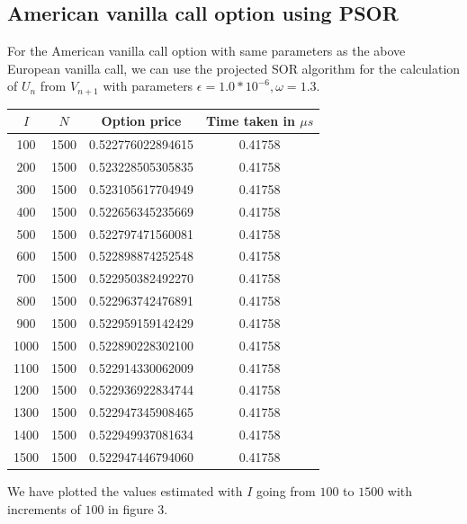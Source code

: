 \subsection{American vanilla call option using PSOR}

For the American vanilla call option with same parameters as the above European vanilla call, we can use the projected SOR algorithm for the calculation of $U_{n}$ from $V_{n+1}$ with parameters $\epsilon = 1.0 * 10^{-6}, \omega = 1.3$.

\begin{center}
	\begin{tabular}{| c | c | c | c |}
		\hline $I$ & $N$ & Option price & Time taken in $\mu s$\\
		[0.5ex]
		\hline 100 & 1500 & 0.522776022894615& 0.41758 \\
		\hline 200 & 1500 & 0.523228505305835& 0.41758 \\
		\hline 300 & 1500 & 0.523105617704949& 0.41758 \\
		\hline 400 & 1500 & 0.522656345235669& 0.41758 \\
		\hline 500 & 1500 & 0.522797471560081& 0.41758 \\
		\hline 600 & 1500 & 0.522898874252548& 0.41758 \\
		\hline 700 & 1500 & 0.522950382492270& 0.41758 \\
		\hline 800 & 1500 & 0.522963742476891& 0.41758 \\
		\hline 900 & 1500 & 0.522959159142429& 0.41758 \\
		\hline 1000 & 1500 &0.522890228302100 & 0.41758 \\
		\hline 1100 & 1500 &0.522914330062009 & 0.41758 \\
		\hline 1200 & 1500 &0.522936922834744 & 0.41758 \\
		\hline 1300 & 1500 &0.522947345908465 & 0.41758 \\
		\hline 1400 & 1500 &0.522949937081634 & 0.41758 \\
		\hline 1500 & 1500 &0.522947446794060 & 0.41758 \\
		\hline
	\end{tabular}
\end{center}

We have plotted the values estimated with $I$ going from $100$ to $1500$ with increments of $100$ in figure 3.

